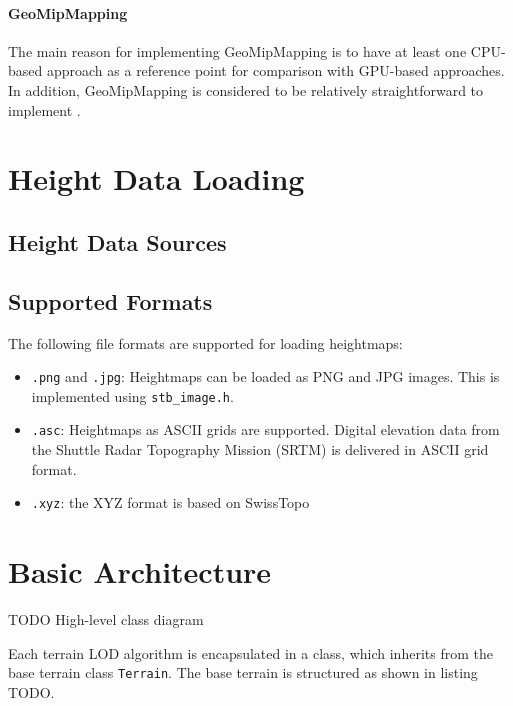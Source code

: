\paragraph{GeoMipMapping} The main reason for implementing GeoMipMapping is to have at least one CPU-based approach
as a reference point for comparison with GPU-based approaches.
In addition, GeoMipMapping is considered to be relatively straightforward to implement \cite[p.~79]{focuson3dterrainprogramming}.


\section{Height Data Loading}
\subsection{Height Data Sources}

\subsection{Supported Formats}
The following file formats are supported for loading heightmaps:
\begin{itemize}
  \item \texttt{.png} and \texttt{.jpg}: Heightmaps can be loaded as PNG and JPG images. This is implemented using \texttt{stb\_image.h}.
  \item \texttt{.asc}: Heightmaps as ASCII grids are supported. Digital elevation data from the Shuttle Radar Topography Mission (SRTM) is delivered in ASCII grid format.
  \item \texttt{.xyz}: the XYZ format is based on SwissTopo
\end{itemize}


\section{Basic Architecture}
TODO High-level class diagram

Each terrain LOD algorithm is encapsulated in a class, which inherits from the base terrain class \texttt{Terrain}.
The base terrain is structured as shown in listing TODO.

